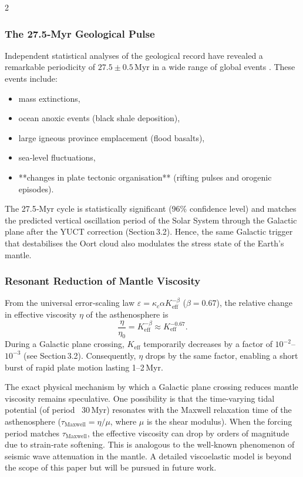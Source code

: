 \documentclass[11pt,a4paper]{article}
\begin{document}
\begin{multicols}{2}
		\subsubsection{The 27.5‑Myr Geological Pulse}
		
		Independent statistical analyses of the geological record have revealed a remarkable periodicity 
		of \(27.5 \pm 0.5\) Myr in a wide range of global events \cite{Rampino2021,Rampino2023}.  
		These events include:
		\begin{itemize}
			\item mass extinctions,
			\item ocean anoxic events (black shale deposition),
			\item large igneous province emplacement (flood basalts),
			\item sea‑level fluctuations,
			\item **changes in plate tectonic organisation** (rifting pulses and orogenic episodes).
		\end{itemize}
		The 27.5‑Myr cycle is statistically significant (96\% confidence level) and matches the predicted 
		vertical oscillation period of the Solar System through the Galactic plane after the YUCT correction 
		(Section 3.2).  Hence, the same Galactic trigger that destabilises the Oort cloud also modulates 
		the stress state of the Earth’s mantle.
		
		\subsubsection{Resonant Reduction of Mantle Viscosity}
		
		From the universal error‑scaling law \(\varepsilon = \kappa_c \alpha K_{\mathrm{eff}}^{-\beta}\) 
		(\(\beta=0.67\)), the relative change in effective viscosity \(\eta\) of the asthenosphere is
		\[
		\frac{\eta}{\eta_0} = K_{\mathrm{eff}}^{-\beta} \approx K_{\mathrm{eff}}^{-0.67}.
		\]
		During a Galactic plane crossing, \(K_{\mathrm{eff}}\) temporarily decreases by a factor of 
		\(10^{-2}\)–\(10^{-3}\) (see Section 3.2).  Consequently, \(\eta\) drops by the same factor, 
		enabling a short burst of rapid plate motion lasting 1–2 Myr.  
		
		The exact physical mechanism by which a Galactic plane crossing reduces mantle viscosity remains speculative. One possibility is that the time‑varying tidal potential (of period ~30 Myr) resonates with the Maxwell relaxation time of the asthenosphere (\(\tau_{\mathrm{Maxwell}} = \eta/\mu\), where \(\mu\) is the shear modulus). When the forcing period matches \(\tau_{\mathrm{Maxwell}}\), the effective viscosity can drop by orders of magnitude due to strain‑rate softening. This is analogous to the well‑known phenomenon of seismic wave attenuation in the mantle. A detailed viscoelastic model is beyond the scope of this paper but will be pursued in future work.
		

\end{multicols}
\end{document}
